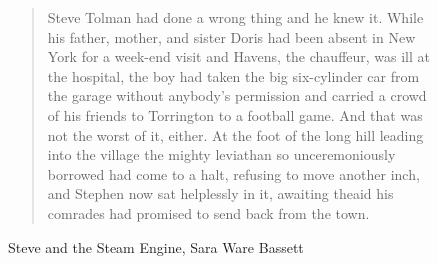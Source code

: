 \documentclass[]{article}
\begin{document}
\begin{figure}
	\begin{quotation}
		Steve Tolman had done a wrong thing and he knew it.
		While his father, mother, and sister Doris had been absent in New York for a week-end visit and Havens, the chauffeur, was ill at the hospital, the boy had taken the big six-cylinder car from the garage without anybody's permission and carried a crowd of his friends to Torrington to a football game. And that was not the worst of it, either. At the foot of the long hill leading into the village the mighty leviathan so unceremoniously borrowed had come to a halt, refusing to move another inch, and Stephen now sat helplessly in it, awaiting theaid his comrades had promised to send back from the town.
	\end{quotation}
	\label{figure:book2}
	\caption{Steve and the Steam Engine, Sara Ware Bassett}
\end{figure}

\printbibliography
\end{document}

